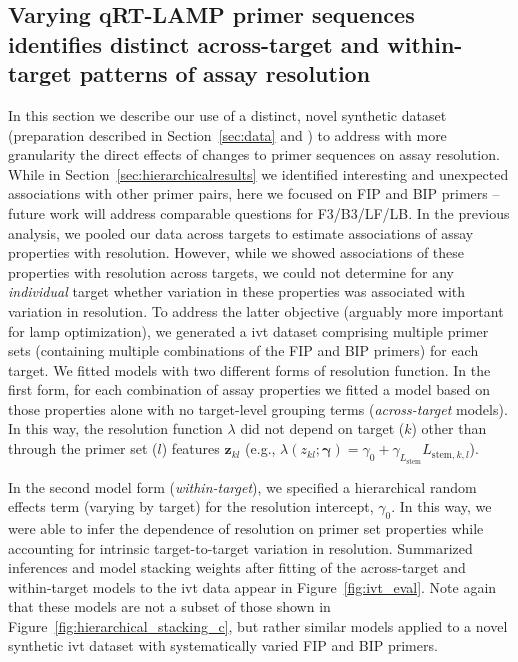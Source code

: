\documentclass[../thesis.tex]{subfiles}
\begin{document}
\subsection{Varying qRT-LAMP primer sequences identifies distinct across-target and within-target patterns of assay resolution \label{sec:ivt_results}}
In this section we describe our use of a distinct, novel synthetic dataset (preparation described in Section~\ref{sec:data} and \citealp{remmel_diagnostic_2022}) to address with more granularity the direct effects of changes to primer sequences on assay resolution. While in Section~\ref{sec:hierarchicalresults} we identified interesting and unexpected associations with other primer pairs, here we focused on FIP and BIP primers -- future work will address comparable questions for F3/B3/LF/LB. In the previous analysis, we pooled our data across targets to estimate associations of assay properties with resolution. However, while we showed associations of these properties with resolution across targets, we could not determine for any \emph{individual} target whether variation in these properties was associated with variation in resolution. To address the latter objective (arguably more important for \gls{lamp} optimization), we generated a \gls{ivt}  dataset comprising multiple primer sets (containing multiple combinations of the FIP and BIP primers) for each target. We fitted models with two different forms of resolution function. In the first form, for each combination of assay properties we fitted a model based on those properties alone with no target-level grouping terms (\emph{across-target} models). In this way, the resolution function $\lambda$ did not depend on target ($k$) other than through the primer set ($l$) features $\bm{z}_{kl}$ (e.g., $\lambda(z_{kl}; \bm{\gamma}) = \gamma_0 + \gamma_{L_{\text{stem}}} L_{\text{stem},k,l}$).
 
In the second model form (\emph{within-target}), we specified a hierarchical random effects term (varying by target) for the resolution intercept, $\gamma_0$. In this way, we were able to infer the dependence of resolution on primer set properties while accounting for intrinsic target-to-target variation in resolution. Summarized inferences and model stacking weights after fitting of the across-target and within-target models to the \gls{ivt}  data appear in Figure~\ref{fig:ivt_eval}. Note again that these models are not a subset of those shown in Figure~\ref{fig:hierarchical_stacking_c}, but rather similar models applied to a novel synthetic \gls{ivt} dataset with systematically varied FIP and BIP primers.
\end{document}

